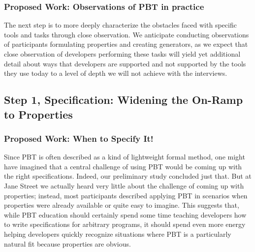 

\subsubsection{Proposed Work: Observations of PBT in practice}
\label{sec:observations}


The next step is to more deeply characterize the obstacles faced with specific
tools and tasks through close observation. We anticipate conducting observations
of participants formulating properties and creating generators, as we expect
that close observation of developers performing these tasks will yield yet
additional detail about ways that developers are supported and not supported by
the tools they use today to a level of depth we will not achieve with the
interviews.

\subsection{Step 1, Specification: Widening the On-Ramp to Properties }\label{sec:spec}
\subsubsection{Proposed Work: When to Specify It!}
Since PBT is often described as a kind of lightweight formal method, one might
have imagined that a central challenge of using PBT would be coming up with the
right specifications. Indeed, our preliminary study concluded just that. But at
Jane Street we actually heard very little about the challenge of coming up with
properties; instead, most participants described applying PBT in scenarios when
properties were already available or quite easy to imagine. This suggests that,
while PBT education should certainly spend some time teaching developers how to
write specifications for arbitrary programs, it should spend even more energy
helping developers quickly recognize  situations where PBT is a particularly
natural fit because properties are obvious.

